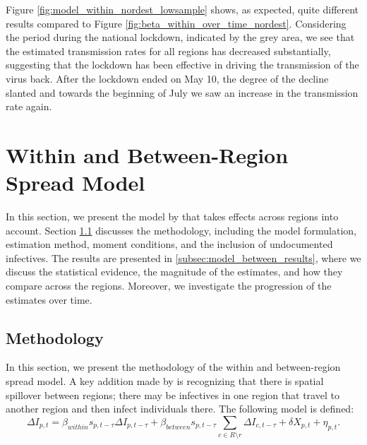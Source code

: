 \documentclass[12pt]{article}
\begin{document}
	Figure \ref{fig:model_within_nordest_lowsample} shows, as expected, quite different results compared to Figure \ref{fig:beta_within_over_time_nordest}. Considering the period during the national lockdown, indicated by the grey area, we see that the estimated transmission rates for all regions has decreased substantially, suggesting that the lockdown has been effective in driving the transmission of the virus back. After the lockdown ended on May 10, the degree of the decline slanted and towards the beginning of July we saw an increase in the transmission rate again.
	
	\section{Within and Between-Region Spread Model} \label{sec:model_between}
	In this section, we present the model by \textcite{adda2016economic} that takes effects across regions into account. Section \ref{subsec:model_between_methodology} discusses the methodology, including the model formulation, estimation method, moment conditions, and the inclusion of undocumented infectives. The results are presented in \ref{subsec:model_between_results}, where we discuss the statistical evidence, the magnitude of the estimates, and how they compare across the regions. Moreover, we investigate the progression of the estimates over time.
	
	\subsection{Methodology} \label{subsec:model_between_methodology}
	In this section, we present the methodology of the within and between-region spread model. A key addition made by \textcite{adda2016economic} is recognizing that there is spatial spillover between regions; there may be infectives in one region that travel to another region and then infect individuals there. The following model is defined:
	\begin{equation} \label{eq:model_between}
	    \Delta I_{p,t} = \beta_{within}s_{p,t-\tau}\Delta I_{p,t-\tau} + \beta_{between}s_{p,t-\tau} \sum_{c \in R \setminus r} \Delta I_{c, t-\tau} + \delta X_{p,t} + \eta_{p,t}.
	\end{equation}
	
\end{document}
